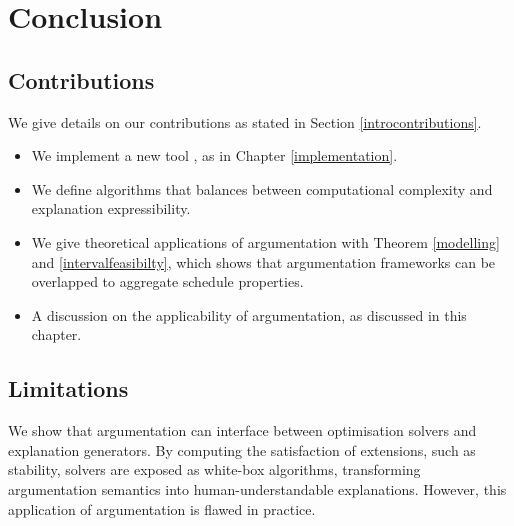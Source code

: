\chapter{Conclusion}

\section{Contributions}
We give details on our contributions as stated in Section \ref{introcontributions}.

\begin{itemize}
	\item We implement a new tool \emph{\toolname}, as in Chapter \ref{implementation}.
	\item We define algorithms that balances between computational complexity and explanation expressibility.
	\item We give theoretical applications of argumentation with Theorem \ref{modelling} and \ref{intervalfeasibilty}, which shows that argumentation frameworks can be overlapped to aggregate schedule properties.
	\item A discussion on the applicability of argumentation, as discussed in this chapter.
\end{itemize}

\section{Limitations}

We show that argumentation can interface between optimisation solvers and explanation generators. By computing the satisfaction of extensions, such as stability, solvers are exposed as white-box algorithms, transforming argumentation semantics into human-understandable explanations. However, this application of argumentation is flawed in practice. 

